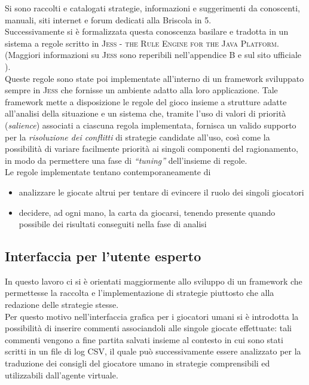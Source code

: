 Si sono raccolti e catalogati strategie, informazioni e suggerimenti da conoscenti, manuali, siti internet e forum dedicati alla Briscola in 5.\\
Successivamente si è formalizzata questa conoscenza basilare e tradotta in un sistema a regole scritto in \textsc{Jess -  the Rule Engine for the Java Platform}. (Maggiori informazioni su \textsc{Jess} sono reperibili nell'appendice B e sul sito ufficiale \cite{jess}).\\
Queste regole sono state poi implementate all'interno di un framework sviluppato sempre in \textsc{Jess} che fornisse un ambiente adatto alla loro applicazione.
Tale framework mette a disposizione le regole del gioco insieme a strutture adatte all'analisi della situazione e un sistema che, tramite l'uso di valori di priorità (\emph{salience}) associati a ciascuna regola implementata, fornisca un valido supporto per la \emph{risoluzione dei conflitti} di strategie candidate all'uso, così come la possibilità di variare facilmente priorità ai singoli componenti del ragionamento, in modo da permettere una fase di \emph{``tuning''} dell'insieme di regole.\\
Le regole implementate tentano contemporaneamente di 
\begin{itemize}
  \item analizzare le giocate altrui per tentare di evincere il ruolo dei singoli giocatori
  \item decidere, ad ogni mano, la carta da giocarsi, tenendo presente quando possibile dei risultati conseguiti nella fase di analisi 
\end{itemize}

\subsection{Interfaccia per l'utente esperto}
In questo lavoro ci si è orientati maggiormente allo sviluppo di un framework che permettesse la raccolta e l'implementazione di strategie piuttosto che alla redazione delle strategie stesse.\\
Per questo motivo nell'interfaccia grafica per i giocatori umani si è introdotta la possibilità di inserire commenti associandoli alle singole giocate effettuate: tali commenti vengono a fine partita salvati insieme al contesto in cui sono stati scritti in un file di log CSV, il quale può successivamente essere analizzato per la traduzione dei consigli del giocatore umano in strategie comprensibili ed utilizzabili dall'agente virtuale.
